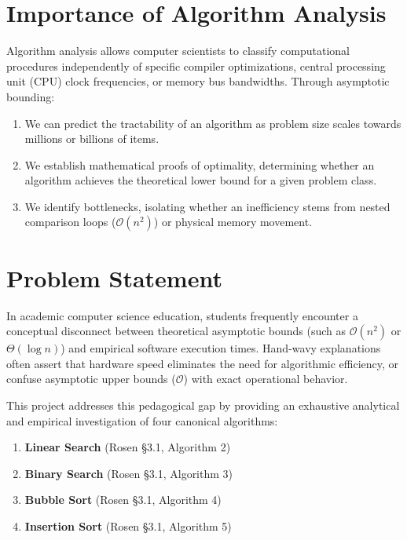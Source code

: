 \documentclass[11pt,a4paper,oneside]{report}
\theoremstyle{definition}
\begin{document}
\section{Importance of Algorithm Analysis}
Algorithm analysis allows computer scientists to classify computational procedures independently of specific compiler optimizations, central processing unit (CPU) clock frequencies, or memory bus bandwidths. Through asymptotic bounding:
\begin{enumerate}
    \item We can predict the tractability of an algorithm as problem size scales towards millions or billions of items.
    \item We establish mathematical proofs of optimality, determining whether an algorithm achieves the theoretical lower bound for a given problem class.
    \item We identify bottlenecks, isolating whether an inefficiency stems from nested comparison loops ($\mathcal{O}(n^2)$) or physical memory movement.
\end{enumerate}

\section{Problem Statement}
In academic computer science education, students frequently encounter a conceptual disconnect between theoretical asymptotic bounds (such as $\mathcal{O}(n^2)$ or $\Theta(\log n)$) and empirical software execution times. Hand-wavy explanations often assert that hardware speed eliminates the need for algorithmic efficiency, or confuse asymptotic upper bounds ($\mathcal{O}$) with exact operational behavior. 

This project addresses this pedagogical gap by providing an exhaustive analytical and empirical investigation of four canonical algorithms:
\begin{enumerate}
    \item \textbf{Linear Search} (Rosen §3.1, Algorithm 2)
    \item \textbf{Binary Search} (Rosen §3.1, Algorithm 3)
    \item \textbf{Bubble Sort} (Rosen §3.1, Algorithm 4)
    \item \textbf{Insertion Sort} (Rosen §3.1, Algorithm 5)
\end{enumerate}
\end{document}
